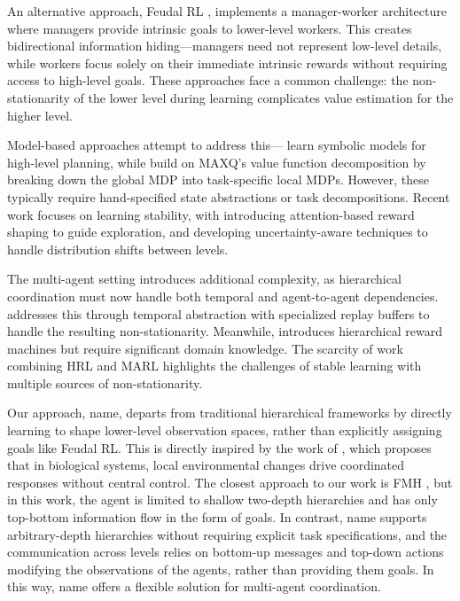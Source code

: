 An alternative approach, Feudal RL \citep{Dayan1992, Kumar2017, Vezhnevets2017}, implements a manager-worker architecture where managers provide intrinsic goals to lower-level workers. This creates bidirectional information hiding—managers need not represent low-level details, while workers focus solely on their immediate intrinsic rewards without requiring access to high-level goals. These approaches face a common challenge: the non-stationarity of the lower level during learning complicates value estimation for the higher level.

Model-based approaches attempt to address this—\citet{Xu2021} learn symbolic models for high-level planning, while \citet{Li2017} build on MAXQ’s value function decomposition by breaking down the global MDP into task-specific local MDPs. However, these typically require hand-specified state abstractions or task decompositions. Recent work focuses on learning stability, with \citet{Luo2023} introducing attention-based reward shaping to guide exploration, and \citet{Hu2023} developing uncertainty-aware techniques to handle distribution shifts between levels.

The multi-agent setting introduces additional complexity, as hierarchical coordination must now handle both temporal and agent-to-agent dependencies. \citet{Tang2018} addresses this through temporal abstraction with specialized replay buffers to handle the resulting non-stationarity. Meanwhile, \citet{Zheng2024} introduces hierarchical reward machines but require significant domain knowledge. The scarcity of work combining HRL and MARL highlights the challenges of stable learning with multiple sources of non-stationarity.

Our approach, \gls{name}, departs from traditional hierarchical frameworks by directly learning to shape lower-level observation spaces, rather than explicitly assigning goals like Feudal RL. This is directly inspired by the work of \citet{Levin22}, which proposes that in biological systems, local environmental changes drive coordinated responses without central control. The closest approach to our work is FMH \citep{Ahilan2019}, but in this work, the agent is limited to shallow two-depth hierarchies and has only top-bottom information flow in the form of goals. In contrast, \gls{name} supports arbitrary-depth hierarchies without requiring explicit task specifications, and the communication across levels relies on bottom-up messages and top-down actions modifying the observations of the agents, rather than providing them goals. In this way, \gls{name} offers a flexible solution for multi-agent coordination.